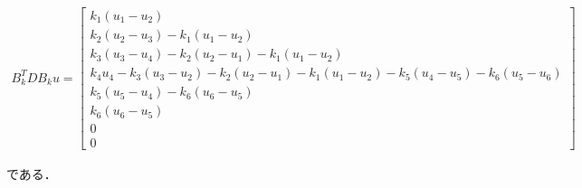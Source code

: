 \begin{eqnarray}
    B_k^T D B_k u =
    \left[\begin{matrix}
        k_1 (u_1 - u_2) \\
        k_2 (u_2 - u_3) - k_1 (u_1 - u_2) \\
        k_3 (u_3 - u_4) - k_2 (u_2 - u_1) - k_1 (u_1 - u_2) \\
        k_4 u_4 - k_3 (u_3 - u_2) - k_2 (u_2 - u_1) - k_1 (u_1 - u_2) - k_5 (u_4 - u_5) - k_6 (u_5 - u_6) \\
        k_5 (u_5 - u_4) - k_6 (u_6 - u_5) \\
        k_6 (u_6 - u_5) \\
        0 \\
        0
    \end{matrix}\right]
\end{eqnarray}

である．
